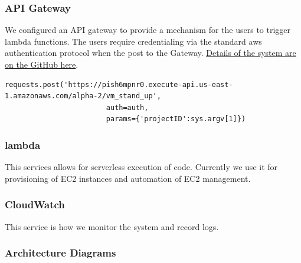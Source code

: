 \subsubsection{API Gateway}
We configured an API gateway to provide a mechanism for the users to trigger lambda functions. The users require credentialing via the standard aws authentication protocol when the post to the Gateway. \href{https://github.com/UVA-DSI/Open-Data-Lab/blob/master/aws/api-gateway/hitapi.py}{Details of the system are on the GitHub here}.
\begin{verbatim}
requests.post('https://pish6mpnr0.execute-api.us-east-1.amazonaws.com/alpha-2/vm_stand_up',
                        auth=auth,
                        params={'projectID':sys.argv[1]})
\end{verbatim}



\subsubsection{lambda}
This services allows for serverless execution of code. Currently we use it for provisioning of EC2 instances and automation of EC2 management.


\subsubsection{CloudWatch}
This service is how we monitor the system and record logs.

\subsubsection{Architecture Diagrams}


